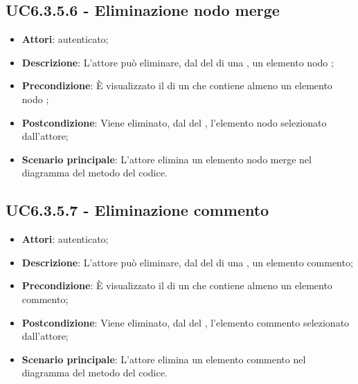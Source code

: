\subsection{UC6.3.5.6 - Eliminazione nodo merge}
\label{ssec:UC6.3.5.6}
\begin{itemize}
\item \textbf{Attori}:  autenticato;
\item \textbf{Descrizione}: L'attore può eliminare, dal  del  di una , un elemento nodo ;
\item \textbf{Precondizione}: È visualizzato il  di un  che contiene almeno un elemento nodo ;
\item \textbf{Postcondizione}: Viene eliminato, dal  del ,  l'elemento nodo  selezionato dall'attore;
\item \textbf{Scenario principale}: L'attore elimina un elemento nodo merge nel diagramma del metodo del codice.
\end{itemize}
\subsection{UC6.3.5.7 - Eliminazione commento}
\label{ssec:UC6.3.5.7}
\begin{itemize}
\item \textbf{Attori}:  autenticato;
\item \textbf{Descrizione}: L'attore può eliminare, dal  del  di una , un elemento commento;
\item \textbf{Precondizione}: È visualizzato il  di un  che contiene almeno un elemento commento;
\item \textbf{Postcondizione}: Viene eliminato, dal  del ,  l'elemento commento selezionato dall'attore;
\item \textbf{Scenario principale}: L'attore elimina un elemento commento nel diagramma del metodo del codice.
\end{itemize}
